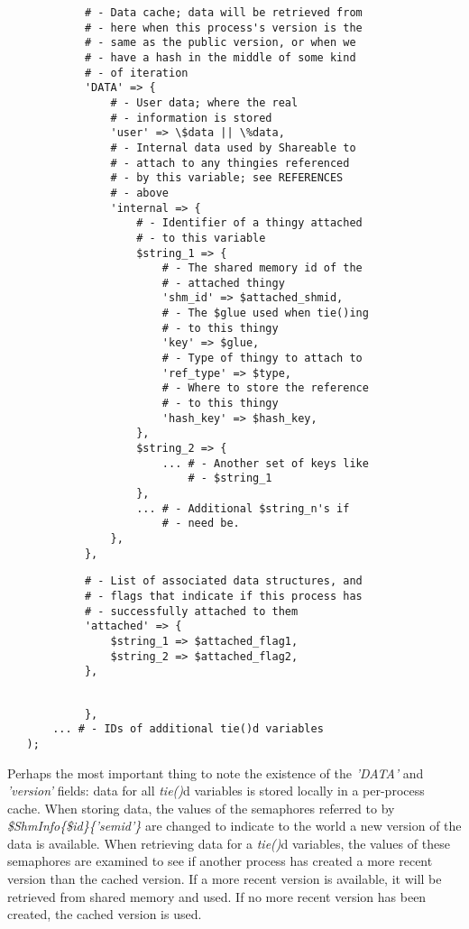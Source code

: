 \begin{verbatim}
            # - Data cache; data will be retrieved from
            # - here when this process's version is the
            # - same as the public version, or when we
            # - have a hash in the middle of some kind
            # - of iteration
            'DATA' => {
                # - User data; where the real
                # - information is stored
                'user' => \$data || \%data,
                # - Internal data used by Shareable to
                # - attach to any thingies referenced
                # - by this variable; see REFERENCES
                # - above
                'internal => {
                    # - Identifier of a thingy attached
                    # - to this variable
                    $string_1 => {
                        # - The shared memory id of the
                        # - attached thingy
                        'shm_id' => $attached_shmid,
                        # - The $glue used when tie()ing
                        # - to this thingy
                        'key' => $glue,
                        # - Type of thingy to attach to
                        'ref_type' => $type,
                        # - Where to store the reference
                        # - to this thingy
                        'hash_key' => $hash_key,
                    },
                    $string_2 => {
                        ... # - Another set of keys like
                            # - $string_1
                    },
                    ... # - Additional $string_n's if
                        # - need be.
                },
            },
\end{verbatim}
\begin{verbatim}
            # - List of associated data structures, and 
            # - flags that indicate if this process has
            # - successfully attached to them
            'attached' => {
                $string_1 => $attached_flag1,
                $string_2 => $attached_flag2,
            },
\end{verbatim}
\begin{verbatim}
            
            },
       ... # - IDs of additional tie()d variables
   );
\end{verbatim}

Perhaps the most important thing to note the existence of the
{\em 'DATA'\/} and {\em 'version'\/} fields: data for all {\em tie()\/}d variables is
stored locally in a per-process cache.  When storing data, the values
of the semaphores referred to by {\em \$Shm\underscore{}Info\{\$id\}\{'sem\underscore{}id'\}\/} are
changed to indicate to the world a new version of the data is
available. When retrieving data for a {\em tie()\/}d variables, the values of
these semaphores are examined to see if another process has created a
more recent version than the cached version.  If a more recent version
is available, it will be retrieved from shared memory and used. If no
more recent version has been created, the cached version is used.

